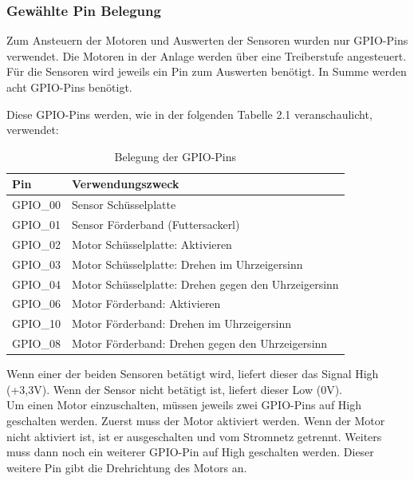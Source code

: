 \vspace{80pt}

\subsubsection{Gewählte Pin Belegung}
Zum Ansteuern der Motoren und Auswerten der Sensoren wurden nur \ac{GPIO}-Pins verwendet. Die Motoren in der Anlage werden über eine Treiberstufe angesteuert. Für die Sensoren wird jeweils ein Pin zum Auswerten benötigt. In Summe werden acht \ac{GPIO}-Pins benötigt. 

\newpage

Diese \ac{GPIO}-Pins werden, wie in der folgenden Tabelle 2.1 veranschaulicht, verwendet:

\begin{table}[htb]
\centering
\begin{tabular}{|l|l|}
\hline
\textbf{Pin} & \textbf{Verwendungszweck}          \\ \hline
\ac{GPIO}\_00     & Sensor Schüsselplatte              \\ \hline
\ac{GPIO}\_01     & Sensor Förderband (Futtersackerl)  \\ \hline
\ac{GPIO}\_02     & Motor Schüsselplatte: Aktivieren \\ \hline
\ac{GPIO}\_03     & Motor Schüsselplatte: Drehen im Uhrzeigersinn \\ \hline
\ac{GPIO}\_04     & Motor Schüsselplatte: Drehen gegen den Uhrzeigersinn \\ \hline
\ac{GPIO}\_06     & Motor Förderband: Aktivieren     \\ \hline
\ac{GPIO}\_10     & Motor Förderband: Drehen im Uhrzeigersinn     \\ \hline
\ac{GPIO}\_08     & Motor Förderband: Drehen gegen den Uhrzeigersinn     \\ \hline
\end{tabular}
\caption{Belegung der \ac{GPIO}-Pins}
\label{Pinbelegung}
\end{table}

Wenn einer der beiden Sensoren betätigt wird, liefert dieser das Signal High (+3,3V). Wenn der Sensor nicht betätigt ist, liefert dieser Low (0V). 
\\ Um einen Motor einzuschalten, müssen jeweils zwei \ac{GPIO}-Pins auf High geschalten werden. Zuerst muss der Motor aktiviert werden. Wenn der Motor nicht aktiviert ist, ist er ausgeschalten und vom Stromnetz getrennt. Weiters muss dann noch ein weiterer \ac{GPIO}-Pin auf High geschalten werden. Dieser weitere Pin gibt die Drehrichtung des Motors an. 

